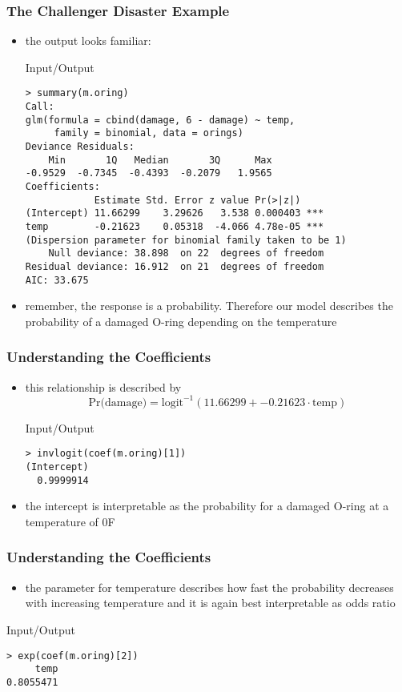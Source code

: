 \begin{frame}[fragile]\frametitle{The Challenger Disaster Example}
\begin{itemize}
\item the output looks familiar:
  \begin{exampleblock}{Input/Output}\scriptsize
\begin{verbatim}
> summary(m.oring)
Call:
glm(formula = cbind(damage, 6 - damage) ~ temp, 
     family = binomial, data = orings)
Deviance Residuals: 
    Min       1Q   Median       3Q      Max  
-0.9529  -0.7345  -0.4393  -0.2079   1.9565  
Coefficients:
            Estimate Std. Error z value Pr(>|z|)    
(Intercept) 11.66299    3.29626   3.538 0.000403 ***
temp        -0.21623    0.05318  -4.066 4.78e-05 ***
(Dispersion parameter for binomial family taken to be 1)
    Null deviance: 38.898  on 22  degrees of freedom
Residual deviance: 16.912  on 21  degrees of freedom
AIC: 33.675
\end{verbatim}
  \end{exampleblock}
\item remember, the response is a probability. Therefore our model describes the probability of a damaged O-ring depending on the temperature
\end{itemize}
\end{frame}


\begin{frame}[fragile]\frametitle{Understanding the Coefficients}
\begin{itemize}
\item this relationship is described by $$\mbox{Pr(damage)}=\mbox{logit}^{-1}(11.66299 + -0.21623 \cdot \mbox{temp}) $$
  \begin{exampleblock}{Input/Output}
\begin{verbatim}
> invlogit(coef(m.oring)[1])
(Intercept) 
  0.9999914 
\end{verbatim}
  \end{exampleblock}
\item the intercept is interpretable as the probability for a damaged O-ring at a temperature of 0\degree F
\end{itemize}
\end{frame}

\begin{frame}[fragile]\frametitle{Understanding the Coefficients}
\begin{itemize}
\item the parameter for temperature describes how fast the probability decreases with increasing temperature and it is again best interpretable as odds ratio 
\end{itemize}
\begin{exampleblock}{Input/Output}
\begin{verbatim}
> exp(coef(m.oring)[2])
     temp 
0.8055471 
\end{verbatim}
\end{exampleblock}
\end{frame}


